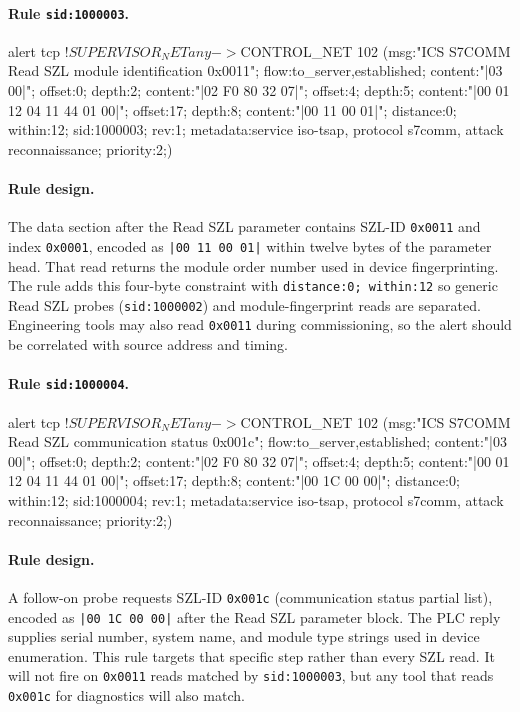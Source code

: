 \documentclass[../main.tex]{subfiles}
\begin{document}
\paragraph{Rule \texttt{sid:1000003}.}
\begin{packetdump}
alert tcp !$SUPERVISOR_NET any -> $CONTROL_NET 102 (msg:"ICS S7COMM Read SZL module identification
  0x0011"; flow:to_server,established; content:"|03 00|"; offset:0; depth:2;
  content:"|02 F0 80 32 07|"; offset:4; depth:5;
  content:"|00 01 12 04 11 44 01 00|"; offset:17; depth:8;
  content:"|00 11 00 01|"; distance:0; within:12; sid:1000003; rev:1;
  metadata:service iso-tsap, protocol s7comm, attack reconnaissance; priority:2;)
\end{packetdump}

\paragraph{Rule design.}
The data section after the Read SZL parameter contains SZL-ID \texttt{0x0011} and index \texttt{0x0001}, encoded as \texttt{|00 11 00 01|} within twelve bytes of the parameter head. That read returns the module order number used in device fingerprinting. The rule adds this four-byte constraint with \texttt{distance:0; within:12} so generic Read SZL probes (\texttt{sid:1000002}) and module-fingerprint reads are separated. Engineering tools may also read \texttt{0x0011} during commissioning, so the alert should be correlated with source address and timing.

\paragraph{Rule \texttt{sid:1000004}.}
\begin{packetdump}
alert tcp !$SUPERVISOR_NET any -> $CONTROL_NET 102 (msg:"ICS S7COMM Read SZL communication status
  0x001c"; flow:to_server,established; content:"|03 00|"; offset:0; depth:2;
  content:"|02 F0 80 32 07|"; offset:4; depth:5;
  content:"|00 01 12 04 11 44 01 00|"; offset:17; depth:8;
  content:"|00 1C 00 00|"; distance:0; within:12; sid:1000004; rev:1;
  metadata:service iso-tsap, protocol s7comm, attack reconnaissance; priority:2;)
\end{packetdump}

\paragraph{Rule design.}
A follow-on probe requests SZL-ID \texttt{0x001c} (communication status partial list), encoded as \texttt{|00 1C 00 00|} after the Read SZL parameter block. The PLC reply supplies serial number, system name, and module type strings used in device enumeration. This rule targets that specific step rather than every SZL read. It will not fire on \texttt{0x0011} reads matched by \texttt{sid:1000003}, but any tool that reads \texttt{0x001c} for diagnostics will also match.
\end{document}
